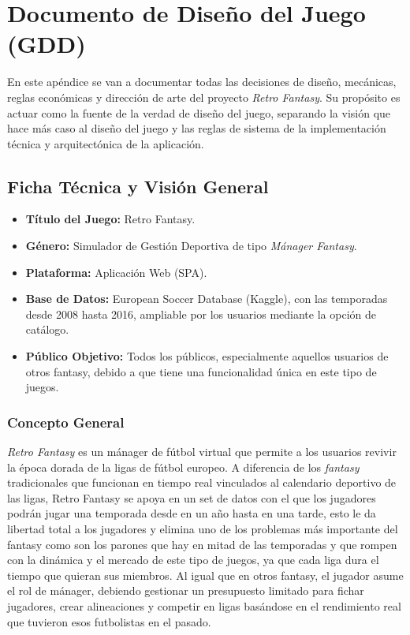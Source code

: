 \chapter{Documento de Diseño del Juego (GDD)}
\label{app:gdd}

En este apéndice se van a documentar todas las decisiones de diseño, mecánicas, reglas económicas y dirección de arte del proyecto \textit{Retro Fantasy}. Su propósito es actuar como la fuente de la verdad de diseño del juego, separando la visión que hace más caso al diseño del juego y las reglas de sistema de la implementación técnica y arquitectónica de la aplicación.

\section{Ficha Técnica y Visión General}
\begin{itemize}
    \item \textbf{Título del Juego:} Retro Fantasy.
    \item \textbf{Género:} Simulador de Gestión Deportiva de tipo \textit{Mánager Fantasy}.
    \item \textbf{Plataforma:} Aplicación Web (SPA).
    \item \textbf{Base de Datos:} European Soccer Database (Kaggle), con las temporadas desde 2008 hasta 2016, ampliable por los usuarios mediante la opción de catálogo.
    \item \textbf{Público Objetivo:} Todos los públicos, especialmente aquellos usuarios de otros fantasy, debido a que tiene una funcionalidad única en este tipo de juegos.
\end{itemize}

\subsection{Concepto General}
\textit{Retro Fantasy} es un mánager de fútbol virtual que permite a los usuarios revivir la época dorada de la ligas de fútbol europeo. A diferencia de los \textit{fantasy} tradicionales que funcionan en tiempo real vinculados al calendario deportivo de las ligas, Retro Fantasy se apoya en un set de datos con el que los jugadores podrán jugar una temporada desde en un año hasta en una tarde, esto le da libertad total a los jugadores y elimina uno de los problemas más importante del fantasy como son los parones que hay en mitad de las temporadas y que rompen con la dinámica y el mercado de este tipo de juegos, ya que cada liga dura el tiempo que quieran sus miembros. Al igual que en otros fantasy, el jugador asume el rol de mánager, debiendo gestionar un presupuesto limitado para fichar jugadores, crear alineaciones y competir en ligas basándose en el rendimiento real que tuvieron esos futbolistas en el pasado.

